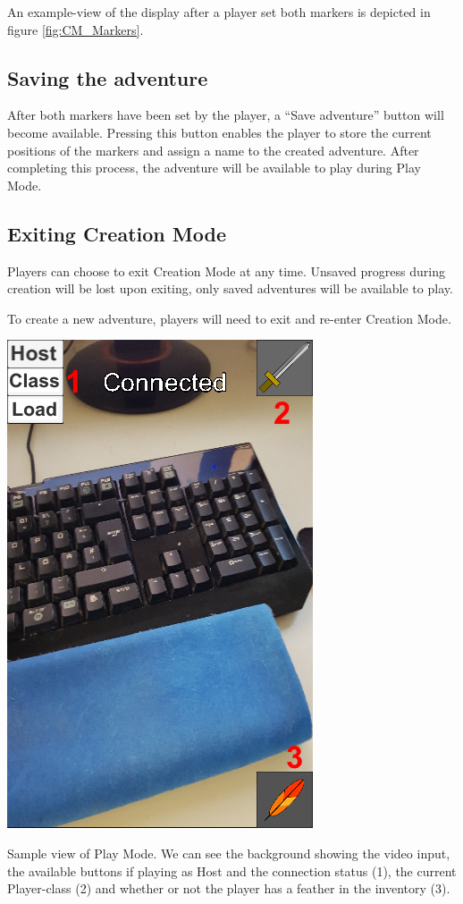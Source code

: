 \documentclass{sigchi-ext}
\begin{document}
An example-view of the display after a player set both markers is depicted in figure \ref{fig:CM_Markers}.



\subsection{Saving the adventure}

After both markers have been set by the player, a ``Save adventure'' button will become available. Pressing this button enables the player to store the current positions of the markers and assign a name to the created adventure. After completing this process, the adventure will be available to play during Play Mode.

\subsection{Exiting Creation Mode}

Players can choose to exit Creation Mode at any time. Unsaved progress during creation will be lost upon exiting, only saved adventures will be available to play.

To create a new adventure, players will need to exit and re-enter Creation Mode.

\begin{marginfigure}[-20pc]
	\begin{minipage}{\marginparwidth}
		\centering
		\includegraphics[width=1\marginparwidth]{figures/PM_Entering}
		\caption{Sample view of Play Mode. We can see the background showing the video input, the available buttons if playing as Host and the connection status (1), the current Player-class (2) and whether or not the player has a feather in the inventory (3). }~\label{fig:PM_Entering}
	\end{minipage}
\end{marginfigure}
\end{document}
